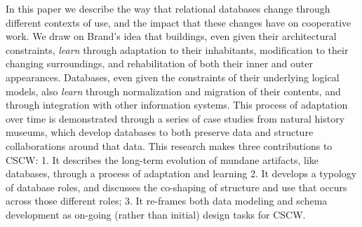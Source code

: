 In this paper we describe the way that relational databases change through different contexts of use, and the impact that these changes have on cooperative work. We draw on Brand's idea that buildings, even given their architectural constraints, \emph{learn} through adaptation to their inhabitants, modification to their changing surroundings, and rehabilitation of both their inner and outer appearances. Databases, even given the constraints of their underlying logical models, also \emph{learn} through normalization and migration of their contents, and through integration with other information systems. This process of adaptation over time is demonstrated through a series of case studies from natural history museums, which develop databases to both preserve data and structure collaborations around that data. This research makes three contributions to CSCW: 1. It describes the long-term evolution of mundane artifacts, like databases, through a process of adaptation and learning 2. It develops a typology of database roles, and discusses the co-shaping of structure and use that occurs across those different roles; 3. It re-frames both data modeling and schema development as on-going (rather than initial) design tasks for CSCW.